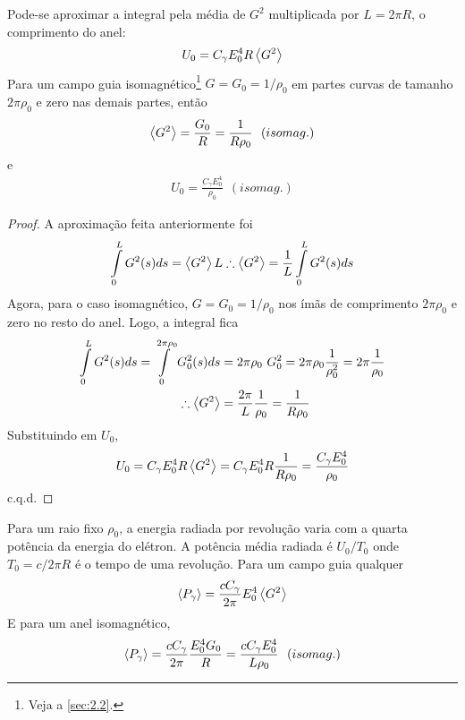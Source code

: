 Pode-se aproximar a integral pela média de $G^2$ multiplicada por $L=2\pi R$, o comprimento do anel:
\begin{align}
	U_0 = C_\gamma E_0^4 R \left< G^2 \right>
\end{align}
Para um campo guia isomagnético\footnote{Veja a \autoref{sec:2.2}.} $G = G_0=1/\rho_0$ em partes curvas de tamanho $2\pi\rho_0$ e zero nas demais partes, então
\begin{align}
	\left< G^2 \right> = \frac{G_0}{R} = \frac{1}{R \rho_0}\ \ (isomag.)
\end{align}
e
\begin{align}
	U_0 = \frac{C_\gamma E_0^4}{\rho_0}\ \ (isomag.)
\end{align}
\begin{proof}
	A aproximação feita anteriormente foi
	\begin{align*}
		\int\limits_{0}^{L}G^2(s)ds = \left< G^2 \right>L \therefore \left< G^2 \right> = \frac{1}{L}\int\limits_{0}^{L}G^2(s)ds
	\end{align*}
	Agora, para o caso isomagnético, $G=G_0=1/\rho_0$ nos ímãs de comprimento $2\pi \rho_0$ e zero no resto do anel. Logo, a integral fica
	\begin{align*}
		\int\limits_{0}^{L}G^2(s)ds = \int\limits_{0}^{2\pi\rho_0}G_0^2(s)ds &= 2\pi\rho_0\ G_0^2 = 2\pi\rho_0 \frac{1}{\rho_0^2} = 2\pi \frac{1}{\rho_0}\\
		\therefore \left< G^2 \right> &= \frac{2\pi}{L} \frac{1}{\rho_0} = \frac{1}{R \rho_0}
	\end{align*}
	Substituindo em $U_0$,
	\begin{align*}
		U_0 = C_\gamma E_0^4 R \left< G^2 \right> = C_\gamma E_0^4 R \frac{1}{R \rho_0} = \frac{C_\gamma E_0^4}{\rho_0}
	\end{align*}
	c.q.d.
\end{proof}

Para um raio fixo $\rho_0$, a energia radiada por revolução varia com a quarta potência da energia do elétron. A potência média radiada é $U_0/T_0$ onde $T_0 = c/2\pi R$ é o tempo de uma revolução. Para um campo guia qualquer
\begin{align}
	\left< P_\gamma \right> = \frac{c C_\gamma}{2\pi} E_0^4 \left< G^2 \right>\label{eq:4.9}
\end{align} 
E para um anel isomagnético,
\begin{align}
	\left< P_\gamma \right> = \frac{c C_\gamma}{2\pi}\frac{E_0^4 G_0}{R} = \frac{c C_\gamma E_0^4}{L \rho_0}\ \ (isomag.)\label{eq:4.10}
\end{align}

